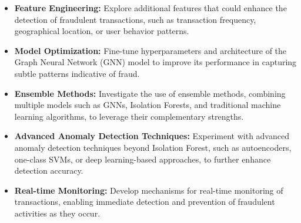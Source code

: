 \begin{itemize}
	\item \textbf{Feature Engineering:} Explore additional features that could enhance the detection of fraudulent transactions, such as transaction frequency, geographical location, or user behavior patterns.
	\item \textbf{Model Optimization:} Fine-tune hyperparameters and architecture of the Graph Neural Network (GNN) model to improve its performance in capturing subtle patterns indicative of fraud.
	
	\item \textbf{Ensemble Methods:} Investigate the use of ensemble methods, combining multiple models such as GNNs, Isolation Forests, and traditional machine learning algorithms, to leverage their complementary strengths.
	
	\item \textbf{Advanced Anomaly Detection Techniques:} Experiment with advanced anomaly detection techniques beyond Isolation Forest, such as autoencoders, one-class SVMs, or deep learning-based approaches, to further enhance detection accuracy.
	
	\item \textbf{Real-time Monitoring:} Develop mechanisms for real-time monitoring of transactions, enabling immediate detection and prevention of fraudulent activities as they occur.
\end{itemize}